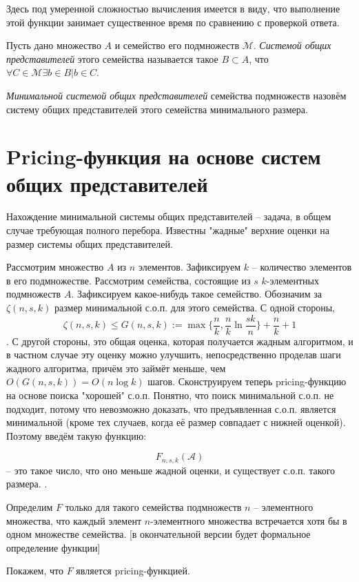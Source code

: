 \documentclass{article}
\begin{document}
Здесь под умеренной сложностью вычисления имеется в виду, что выполнение этой функции занимает существенное время по сравнению с проверкой ответа.

Пусть дано множество $A$ и семейство его подмножеств $\mathcal{M}$. \textit{Системой общих представителей} этого семейства называется такое $B \subset A$, что $\forall C \in \mathcal{M} \exists b \in B | b \in C$. 

\textit{Минимальной системой общих представителей} семейства подмножеств назовём систему общих представителей этого семейства минимального размера.

\section{Pricing-функция на основе систем общих представителей}

    Нахождение минимальной системы общих представителей -- задача, в общем случае требующая полного перебора. Известны "жадные" верхние оценки на размер системы общих представителей. 

    Рассмотрим множество $A$ из $n$ элементов. Зафиксируем $k$ -- количество элементов в его подмножестве. Рассмотрим семейства, состоящие из $s$ $k$-элементных подмножеств $A$. Зафиксируем какое-нибудь такое семейство.
    Обозначим за $\zeta(n, s, k)$ размер минимальной с.о.п. для этого семейства. С одной стороны, $$\zeta(n, s, k) \leq G(n, s, k) := \max\{\frac{n}{k}, \frac{n}{k} \ln \frac{sk}{n}\} + \frac{n}{k} + 1$$. С другой стороны, это общая оценка, которая получается жадным алгоритмом, и в частном случае эту оценку можно улучшить, непосредственно проделав шаги жадного алгоритма, причём это займёт меньше, чем $O(G(n, s, k)) = O(n \log k)$ шагов.
    Сконструируем теперь pricing-функцию на основе поиска "хорошей" с.о.п. Понятно, что поиск минимальной с.о.п. не подходит, потому что невозможно доказать, что предъявленная с.о.п. является минимальной (кроме тех случаев, когда её размер совпадает с нижней оценкой). Поэтому введём такую функцию:

    $$F_{n,s,k}(\mathcal{A}) $$ -- это такое число, что оно меньше жадной оценки, и существует с.о.п. такого размера. .

    Определим $F$ только для такого семейства подмножеств $n$ -- элементного множества, что каждый элемент $n$-элементного множества встречается хотя бы в одном множестве семейства.
[в окончательной версии будет формальное определение функции]

    Покажем, что $F$ является pricing-функцией. 
\end{document}
